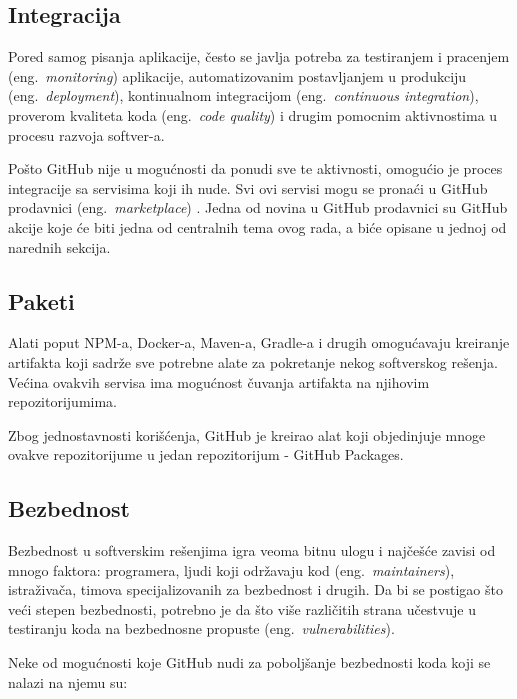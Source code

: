 \documentclass[12pt]{report}
\begin{document}
\subsection{Integracija}
Pored samog pisanja aplikacije, često se javlja potreba za testiranjem i pracenjem (eng.\ \textit{monitoring}) aplikacije, automatizovanim postavljanjem u produkciju (eng.\ \textit{deployment}), kontinualnom integracijom (eng.\ \textit{continuous integration}), proverom kvaliteta koda (eng.\ \textit{code quality}) i drugim pomocnim aktivnostima u procesu razvoja softver-a.

Pošto GitHub nije u mogućnosti da ponudi sve te aktivnosti, omogućio je proces integracije sa servisima koji ih nude. Svi ovi servisi mogu se pronaći u GitHub prodavnici (eng.\ \textit{marketplace}) \cite{marketplace}. Jedna od novina u GitHub prodavnici su GitHub akcije koje će biti jedna od centralnih tema ovog rada, a biće opisane u jednoj od narednih sekcija.

\subsection{Paketi}
Alati poput NPM-a, Docker-a, Maven-a, Gradle-a i drugih omogućavaju kreiranje artifakta koji sadrže sve potrebne alate za pokretanje nekog softverskog rešenja. Većina ovakvih servisa ima mogućnost čuvanja artifakta na njihovim repozitorijumima.

Zbog jednostavnosti korišćenja, GitHub je kreirao alat koji objedinjuje mnoge ovakve repozitorijume u jedan repozitorijum - GitHub Packages.

\subsection{Bezbednost}
Bezbednost u softverskim rešenjima igra veoma bitnu ulogu i najčešće zavisi od mnogo faktora: programera, ljudi koji održavaju kod (eng.\ \textit{maintainers}), istraživača, timova specijalizovanih za bezbednost i drugih. Da bi se postigao što veći stepen bezbednosti, potrebno je da što više različitih strana učestvuje u testiranju koda na bezbednosne propuste (eng.\ \textit{vulnerabilities}).

Neke od mogućnosti koje GitHub nudi za poboljšanje bezbednosti koda koji se nalazi na njemu su:
\end{document}
